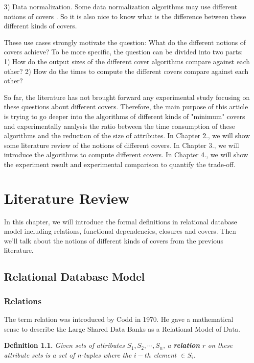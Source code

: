 \documentclass[11pt]{book}
\newtheorem{mydef}[thm]{Definition}
\begin{document}
3) Data normalization. Some data normalization algorithms may use different notions of covers \cite{koehler2006finding,beeri1979computational}. So it is also nice to know what is the difference between these different kinds of covers.

These use cases strongly motivate the question: What do the different notions of covers achieve? To be more specific, the question can be divided into two parts: 1) How do the output sizes of the different cover algorithms compare against each other? 2) How do the times to compute the different covers compare against each other?

So far, the literature has not brought forward any experimental study focusing on these questions about different covers. Therefore, the main purpose of this article is trying to go deeper into the algorithms of different kinds of "minimum" covers and experimentally analysis the ratio between the time consumption of these algorithms and the reduction of the size of attributes. In Chapter 2., we will show some literature review of the notions of different covers. In Chapter 3., we will introduce the algorithms to compute different covers. In Chapter 4., we will show the experiment result and experimental comparison to quantify the trade-off.

\chapter{Literature Review}

In this chapter, we will introduce the formal definitions in relational database model including relations, functional dependencies, closures and covers. Then we'll talk about the notions of different kinds of covers from the previous literature.

\section{Relational Database Model}

\subsection{Relations}

The term relation was introduced by Codd \cite{codd13f} in 1970. He gave a mathematical sense to describe the Large Shared Data Banks as a Relational Model of Data. 

\begin{mydef}
Given sets of attributes $S_1, S_2, \cdots, S_n$, a \textbf{relation} $r$ on these attribute sets is a set of n-tuples where the $i-th$ element $\in S_i$.
\end{mydef}
\end{document}
